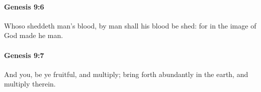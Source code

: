 		\paragraph{Genesis 9:6} %
			\label{GENESIS-9-6}

			Whoso sheddeth man's blood, by man shall his blood be shed: for in the image of God made he man.


		\paragraph{Genesis 9:7} %
			\label{GENESIS-9-7}

			And you, be ye fruitful, and multiply; bring forth abundantly in the earth, and multiply therein.


